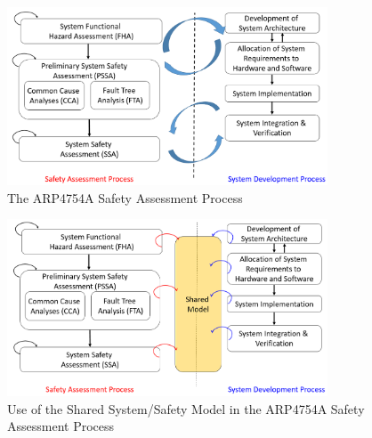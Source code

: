 \begin{figure}[t!]
	
	\centering
	\includegraphics[trim=0 5 0 5,clip,width=0.85\textwidth]{images/process1.png}
	
	\caption{The ARP4754A Safety Assessment Process}
	\label{fig:safety_process}
\end{figure}

\begin{figure}[t!]
	
	\centering
	\includegraphics[trim=0 5 0 5,clip,width=0.85\textwidth]{images/process2.png}
	
	\caption{Use of the Shared System/Safety Model in the ARP4754A Safety Assessment Process}
	\label{fig:proposed_safety_process}
\end{figure}

